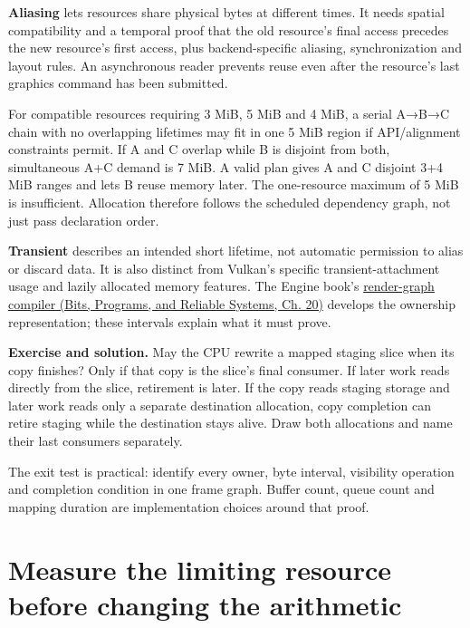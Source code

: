 \textbf{Aliasing} lets resources share physical bytes at different times. It needs spatial compatibility and a temporal proof that the old resource's final access precedes the new resource's first access, plus backend-specific aliasing, synchronization and layout rules. An asynchronous reader prevents reuse even after the resource's last graphics command has been submitted.

For compatible resources requiring 3 MiB, 5 MiB and 4 MiB, a serial A→B→C chain with no overlapping lifetimes may fit in one 5 MiB region if API/alignment constraints permit. If A and C overlap while B is disjoint from both, simultaneous A+C demand is 7 MiB. A valid plan gives A and C disjoint 3+4 MiB ranges and lets B reuse memory later. The one-resource maximum of 5 MiB is insufficient. Allocation therefore follows the scheduled dependency graph, not just pass declaration order.

\textbf{Transient} describes an intended short lifetime, not automatic permission to alias or discard data. It is also distinct from Vulkan's specific transient-attachment usage and lazily allocated memory features. The Engine book's \href{../01-Bits-Programs-and-Reliable-Systems/main.pdf\#nameddest=06-engine-ii-ch042-from-a-list-of-render-passes-to-a-proved-execution-order}{render-graph compiler (Bits, Programs, and Reliable Systems, Ch. 20)} develops the ownership representation; these intervals explain what it must prove.

\textbf{Exercise and solution.} May the CPU rewrite a mapped staging slice when its copy finishes? Only if that copy is the slice's final consumer. If later work reads directly from the slice, retirement is later. If the copy reads staging storage and later work reads only a separate destination allocation, copy completion can retire staging while the destination stays alive. Draw both allocations and name their last consumers separately.

The exit test is practical: identify every owner, byte interval, visibility operation and completion condition in one frame graph. Buffer count, queue count and mapping duration are implementation choices around that proof.

\section{Measure the limiting resource before changing the arithmetic}\label{03-visual-computing-i-ch016-measure-the-limiting-resource-before-changing-the-arithmetic}


